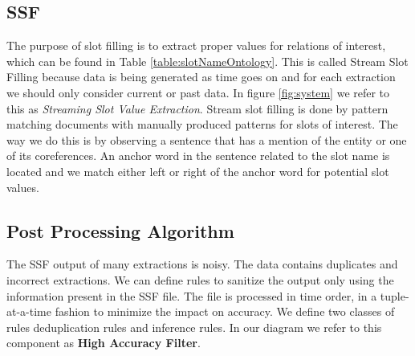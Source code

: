 \subsection{SSF}
The purpose of slot filling is to extract proper values for relations of interest, which can be found in Table \ref{table:slotNameOntology}. This is called Stream Slot Filling because data is being generated as time goes on and for each extraction we should only consider current or past data. In figure \ref{fig:system} we refer to this as \textit{Streaming Slot Value Extraction}. Stream slot filling is done by pattern matching documents with manually 
produced patterns for slots of interest. The way we do this is by observing a 
sentence that has a mention of the entity or one of its coreferences. An 
anchor word in the sentence related to the slot name is located and we match 
either left or right of the anchor word for potential slot values. 

\subsection{Post Processing Algorithm}

The SSF output of many extractions is noisy. The data contains duplicates and 
incorrect extractions. We can define rules to sanitize the output only using 
the information present in the SSF file. The file is processed in time order, 
in a tuple-at-a-time fashion to minimize the impact on accuracy. We define 
two classes of rules deduplication rules and inference rules. In our diagram we refer to this component as \textbf{High Accuracy Filter}.
